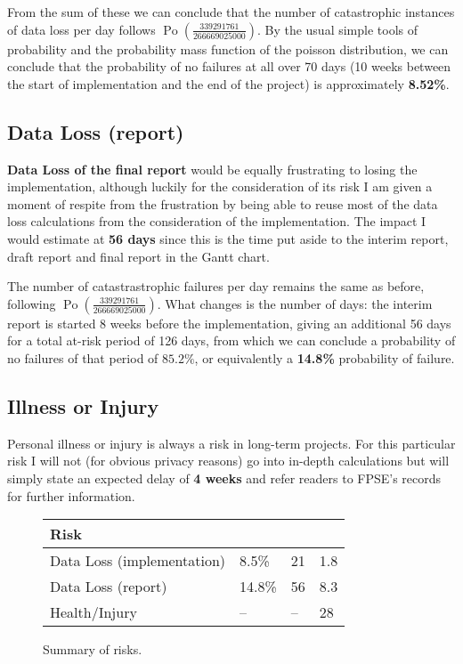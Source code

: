 From the sum of these we can conclude that the number of catastrophic
instances of data loss per day follows $\operatorname{Po}(\frac{339291761}
{266669025000})$. By the usual simple tools of probability and the
probability mass function of the poisson distribution, we can conclude that
the probability of no failures at all over 70 days (10 weeks between the
start of implementation and the end of the project) is approximately
\textbf{8.52\%}.

\subsection{Data Loss (report)}

\textbf{Data Loss of the final report} would be equally frustrating to
losing the implementation, although luckily for the consideration of its
risk I am given a moment of respite from the frustration by being able to
reuse most of the data loss calculations from the consideration of the
implementation. The impact I would estimate at \textbf{56 days} since this
is the time put aside to the interim report, draft report and final report
in the Gantt chart.

The number of catastrastrophic failures per day remains the same as before,
following $\operatorname{Po}(\frac{339291761}{266669025000})$. What changes
is the number of days: the interim report is started 8 weeks before the
implementation, giving an additional 56 days for a total at-risk period of
126 days, from which we can conclude a probability of no failures of that period
of $85.2\%$, or equivalently a \textbf{14.8\%} probability of failure.

\subsection{Illness or Injury}

Personal illness or injury is always a risk in long-term projects.
For this particular risk I will not (for obvious privacy reasons)
go into in-depth calculations but will simply state an expected
delay of \textbf{4 weeks} and refer readers to FPSE's records for
further information.

\begin{figure}
\begin{tabu} to 0.9\linewidth { X[7,r] | X[c] | X[c] | X[c] }
  \textbf{Risk} &  &
     &  \\
    \hline
    Data Loss (implementation) & 8.5\%
                               & 21
                               & 1.8 \\
    Data Loss (report) & 14.8\%
                       & 56
                       & 8.3 \\
    Health/Injury & --
                  & --
                  & 28
\end{tabu}
\caption{Summary of risks.}
\label{fig:risks}
\end{figure}

